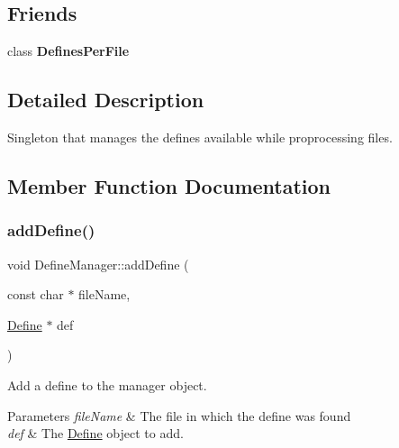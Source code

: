 \subsection*{Friends}
\begin{DoxyCompactItemize}
\item 
\mbox{\label{class_define_manager_a8146c1027737f308e2f7c7dc67a09f87}} 
class {\bfseries Defines\+Per\+File}
\end{DoxyCompactItemize}


\subsection{Detailed Description}
Singleton that manages the defines available while proprocessing files. 

\subsection{Member Function Documentation}
\mbox{\label{class_define_manager_add50ce745af761cdf1d05428855ada2c}} 
\subsubsection{\texorpdfstring{addDefine()}{addDefine()}}
{\footnotesize\ttfamily void Define\+Manager\+::add\+Define (\begin{DoxyParamCaption}\item[{const char $\ast$}]{file\+Name,  }\item[{\mbox{\hyperlink{class_define}{Define}} $\ast$}]{def }\end{DoxyParamCaption})\hspace{0.3cm}{\ttfamily [inline]}}

Add a define to the manager object. 
\begin{DoxyParams}{Parameters}
{\em file\+Name} & The file in which the define was found \\
\hline
{\em def} & The \mbox{\hyperlink{class_define}{Define}} object to add. \\
\hline
\end{DoxyParams}
\mbox{\label{class_define_manager_a9398543779e313d7fee799d200d2054b}} 
